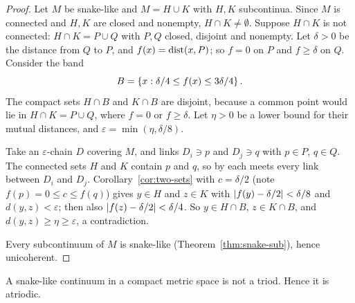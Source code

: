 \begin{proof}
Let $M$ be snake-like and $M=H\cup K$ with $H,K$ subcontinua. Since $M$ is connected and $H,K$ are
closed and nonempty, $H\cap K\neq\emptyset$. Suppose $H\cap K$ is not connected: $H\cap K=P\cup Q$ with
$P,Q$ closed, disjoint and nonempty. Let $\delta>0$ be the distance from $Q$ to $P$, and
$f(x)=\operatorname{dist}(x,P)$; so $f=0$ on $P$ and $f\ge\delta$ on $Q$. Consider the band
\[
B=\left\{ x:\delta/4\le f(x)\le3\delta/4 \right\}.
\]
The compact sets $H\cap B$ and $K\cap B$ are disjoint, because a common point would lie in $H\cap
K=P\cup Q$, where $f=0$ or $f\ge\delta$. Let $\eta>0$ be a lower bound for their mutual distances, and
$\varepsilon=\min(\eta,\delta/8)$.

Take an $\varepsilon$-chain $D$ covering $M$, and links $D_i\ni p$ and $D_j\ni q$ with $p\in P$, $q\in
Q$. The connected sets $H$ and $K$ contain $p$ and $q$, so by  each meets every link
between $D_i$ and $D_j$. Corollary~\ref{cor:two-sets} with $c=\delta/2$ (note $f(p)=0\le c\le f(q)$)
gives $y\in H$ and $z\in K$ with $\left\lvert f(y)-\delta/2\right\rvert<\delta/8$ and $d(y,z)<\varepsilon$; then also
$\left\lvert f(z)-\delta/2\right\rvert<\delta/4$. So $y\in H\cap B$, $z\in K\cap B$, and $d(y,z)\ge\eta\ge\varepsilon$, a
contradiction.

Every subcontinuum of $M$ is snake-like (Theorem~\ref{thm:snake-sub}), hence unicoherent.
\end{proof}


\begin{theorem}\label{thm:snake-atriodic}
A snake-like continuum in a compact metric space is not a triod. Hence it is atriodic.
\end{theorem}

